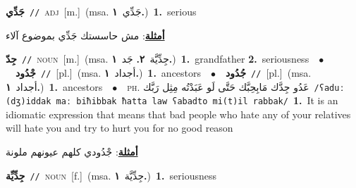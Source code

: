 \documentclass[10pt,a4paper,twoside]{article} %
\begin{document}
\begin{multicols}{2}
{{{{{{{{{{{\setlength\topsep{0pt}\textbf{\foreignlanguage{arabic}{جَدِّي}}\ {\color{gray}\texttt{//}\color{black}}\ \textsc{adj}\ [m.]\ \color{gray}(msa. \foreignlanguage{arabic}{جَدِّي}~\foreignlanguage{arabic}{\textbf{١.}})\color{black}\ \textbf{1.}~serious\  \begin{flushright}\color{gray}\foreignlanguage{arabic}{\textbf{\underline{\foreignlanguage{arabic}{أمثلة}}}: مش حاسستك جَدِّي بموضوع آلاء}\end{flushright}\color{black}} \vspace{2mm}

{\setlength\topsep{0pt}\textbf{\foreignlanguage{arabic}{جِدّ}}\ {\color{gray}\texttt{//}\color{black}}\ \textsc{noun}\ [m.]\ \color{gray}(msa. \foreignlanguage{arabic}{جِدِّيَّة}~\foreignlanguage{arabic}{\textbf{٢.}}  \foreignlanguage{arabic}{جَد}~\foreignlanguage{arabic}{\textbf{١.}})\color{black}\ \textbf{1.}~grandfather  \textbf{2.}~seriousness\ \ $\bullet$\ \ \setlength\topsep{0pt}\textbf{\foreignlanguage{arabic}{جْدُود}}\ {\color{gray}\texttt{//}\color{black}}\ [pl.]\ \color{gray}(msa. \foreignlanguage{arabic}{أجداد}~\foreignlanguage{arabic}{\textbf{١.}})\color{black}\ \textbf{1.}~ancestors\ \ $\bullet$\ \ \setlength\topsep{0pt}\textbf{\foreignlanguage{arabic}{جُدُود}}\ {\color{gray}\texttt{//}\color{black}}\ [pl.]\ \color{gray}(msa. \foreignlanguage{arabic}{أجداد}~\foreignlanguage{arabic}{\textbf{١.}})\color{black}\ \textbf{1.}~ancestors\ \ $\bullet$\ \ \textsc{ph.} \color{gray} \foreignlanguage{arabic}{عَدُو جِدَّك مَابِحِبَّك حَتَّى لَو عَبَدْتُه مِثِل رَبَّك}\color{black}\ {\color{gray}\texttt{/{\sffamily ʕaduː (dʒ)iddak maː biħibbak ħatta law ʕabadto mi(t)il rabbak}/}\color{black}}\ \textbf{1.}~It is an idiomatic expression that means that bad people who hate any of your relatives will hate you and try to hurt you for no good reason\  \begin{flushright}\color{gray}\foreignlanguage{arabic}{\textbf{\underline{\foreignlanguage{arabic}{أمثلة}}}: جْدُودي كلهم عيونهم ملونة}\end{flushright}\color{black}} \vspace{2mm}

{\setlength\topsep{0pt}\textbf{\foreignlanguage{arabic}{جِدِّيِّة}}\ {\color{gray}\texttt{//}\color{black}}\ \textsc{noun}\ [f.]\ \color{gray}(msa. \foreignlanguage{arabic}{جِدِّيَّة}~\foreignlanguage{arabic}{\textbf{١.}})\color{black}\ \textbf{1.}~seriousness\ 

}}}}}}}}}}}
\end{multicols}
\end{document}
